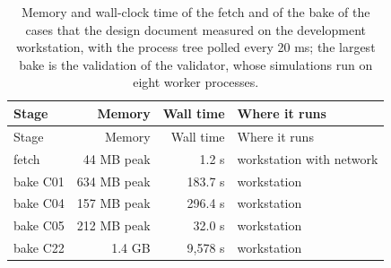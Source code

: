 {\footnotesize
\setlength{\tabcolsep}{3pt}
\renewcommand{\arraystretch}{1.12}
\begin{longtable}{lrrl}
\caption{Memory and wall-clock time of the fetch and of the bake of the cases that the design document measured on the development workstation, with the process tree polled every 20 ms; the largest bake is the validation of the validator, whose simulations run on eight worker processes.}\label{tab:protocol-resources}\\
\toprule
Stage & Memory & Wall time & Where it runs \\
\midrule
\endfirsthead
\toprule
Stage & Memory & Wall time & Where it runs \\
\midrule
\endhead
\bottomrule
\endfoot
fetch & 44 MB peak & 1.2 s & workstation with network \\
bake C01 & 634 MB peak & 183.7 s & workstation \\
bake C04 & 157 MB peak & 296.4 s & workstation \\
bake C05 & 212 MB peak & 32.0 s & workstation \\
bake C22 & 1.4 GB & 9,578 s & workstation \\
\end{longtable}
}
